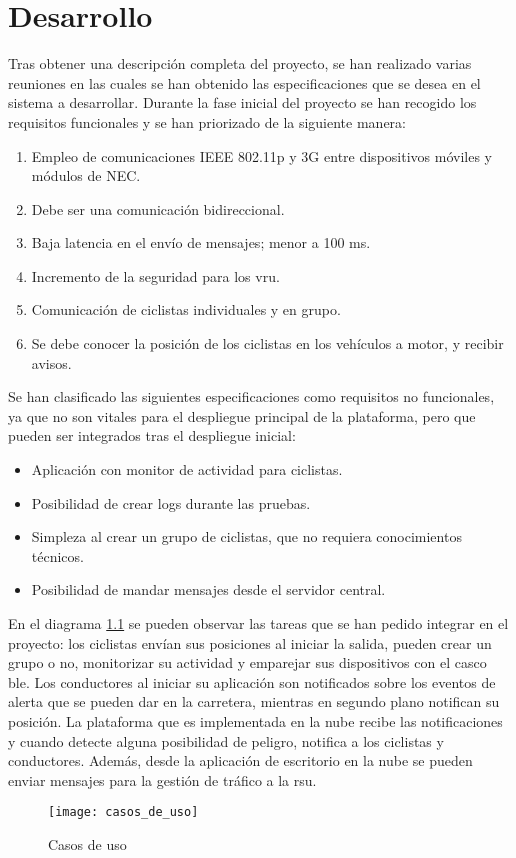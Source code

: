 \chapter{Desarrollo}\label{cha:desarrollo}
Tras obtener una descripción completa del proyecto, se han realizado varias reuniones en las cuales se han obtenido las especificaciones que se desea en el sistema a desarrollar. Durante la fase inicial del proyecto se han recogido los requisitos funcionales y se han priorizado de la siguiente manera:
\begin{enumerate}
	\item Empleo de comunicaciones IEEE 802.11p y 3G entre dispositivos móviles y módulos de NEC.
	\item Debe ser una comunicación bidireccional.
	\item Baja latencia en el envío de mensajes; menor a 100 ms.
	\item Incremento de la seguridad para los \gls{vru}.
	\item Comunicación de ciclistas individuales y en grupo.
	\item Se debe conocer la posición de los ciclistas en los vehículos a motor, y recibir avisos.
\end{enumerate}

Se han clasificado las siguientes especificaciones como requisitos no funcionales, ya que no son vitales para el despliegue principal de la plataforma, pero que pueden ser integrados tras el despliegue inicial:
\begin{itemize}
	\item Aplicación con monitor de actividad para ciclistas.
	\item Posibilidad de crear logs durante las pruebas.
	\item Simpleza al crear un grupo de ciclistas, que no requiera conocimientos técnicos.
	\item Posibilidad de mandar mensajes desde el servidor central.
\end{itemize}

En el diagrama \ref{fig:casos_de_uso} se pueden observar las tareas que se han pedido integrar en el proyecto: los ciclistas envían sus posiciones al iniciar la salida, pueden crear un grupo o no, monitorizar su actividad y emparejar sus dispositivos con el casco \gls{ble}. Los conductores al iniciar su aplicación son notificados sobre los eventos de alerta que se pueden dar en la carretera, mientras en segundo plano notifican su posición. La plataforma que es implementada en la nube recibe las notificaciones y cuando detecte alguna posibilidad de peligro, notifica a los ciclistas y conductores. Además, desde la aplicación de escritorio en la nube se pueden enviar mensajes para la gestión de tráfico a la \gls{rsu}.
\begin{figure}[H]
	\begin{center}
		\texttt{[image: casos\_de\_uso]}
		\caption{Casos de uso}
		\label{fig:casos_de_uso}
	\end{center}
\end{figure}


